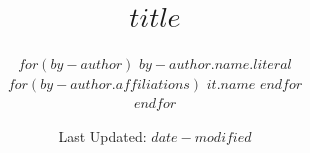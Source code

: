 \title{$title$}

\author{
  $for(by-author)$
    {$by-author.name.literal$  \href{mailto:$by-author.email$}{\Letter}} \\
    $for(by-author.affiliations)$
      $it.name$
    $endfor$ \\
  $endfor$}

\date{Last Updated: $date-modified$}